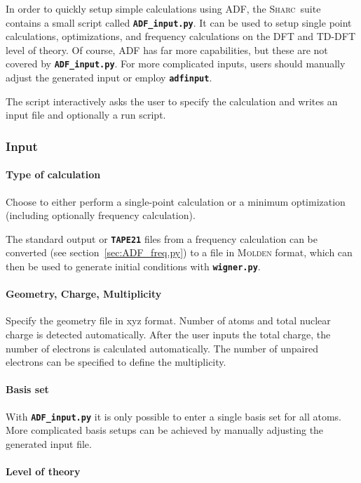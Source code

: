 \documentclass[a4paper,10pt,DIV=15,openany,twoside=false]{scrbook}
\newcommand{\sharc}{\textsc{Sharc}}
\newcommand{\ttt}[1]{\textbf{\texttt{#1}}}
\begin{document}
In order to quickly setup simple calculations using ADF, the \sharc\ suite contains a small script called \ttt{ADF\_input.py}. It can be used to setup single point calculations, optimizations, and frequency calculations on the DFT and TD-DFT level of theory. Of course, ADF has far more capabilities, but these are not covered by \ttt{ADF\_input.py}. For more complicated inputs, users should manually adjust the generated input or employ \ttt{adfinput}.

The script interactively asks the user to specify the calculation and writes an input file and optionally a run script.

\subsubsection{Input}

\paragraph{Type of calculation}

Choose to either perform a single-point calculation or a minimum optimization (including optionally frequency calculation).

The standard output or \ttt{TAPE21} files from a frequency calculation can be converted (see section~\ref{sec:ADF_freq.py}) to a file in \textsc{Molden} format, which can then be used to generate initial conditions with \ttt{wigner.py}.

\paragraph{Geometry, Charge, Multiplicity}

Specify the geometry file in xyz format. Number of atoms and total nuclear charge is detected automatically. After the user inputs the total charge, the number of electrons is calculated automatically. The number of unpaired electrons can be specified to define the multiplicity.

\paragraph{Basis set}

With \ttt{ADF\_input.py} it is only possible to enter a single basis set for all atoms. More complicated basis setups can be achieved by manually adjusting the generated input file.

\paragraph{Level of theory}
\end{document}
